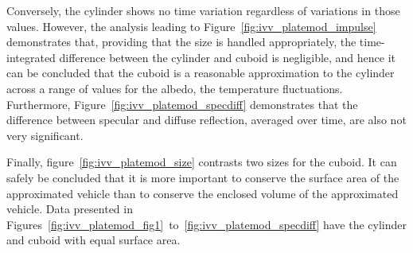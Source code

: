 \begin{description}
      Conversely, the cylinder shows no time variation
      regardless of variations in those values.
      However, the analysis leading to
      Figure~\ref{fig:ivv_platemod_impulse}
      demonstrates that, providing that the size is handled appropriately, the
      time-integrated difference between the cylinder and cuboid is
      negligible, and hence it can be concluded that the cuboid is a reasonable
      approximation to the cylinder across a range of values for the albedo,
      the temperature fluctuations.  Furthermore, Figure~\ref{fig:ivv_platemod_specdiff} demonstrates that the difference between specular and diffuse reflection, averaged over time, are also not very significant.

      Finally, figure~\ref{fig:ivv_platemod_size} contrasts two sizes for
      the cuboid.  It can safely be concluded that it is more important to
      conserve the surface area of the approximated vehicle than to conserve the
      enclosed volume of the approximated vehicle.  Data presented in
      Figures~\ref{fig:ivv_platemod_fig1}~to~\ref{fig:ivv_platemod_specdiff}
      have the cylinder and cuboid with equal surface area.


\end{description}
